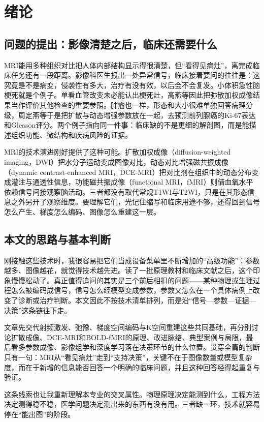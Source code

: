 \section{绪论}

\subsection{问题的提出：影像清楚之后，临床还需要什么}

MRI能用多种组织对比把人体内部结构显示得很清楚，但“看得见病灶”，离完成临床任务还有一段距离。影像科医生报出一处异常信号，临床接着要问的往往是：这究竟是不是病变，侵袭性有多大，治疗有没有效，以后会不会复发。小体积急性脑梗死就是个例子。单看血管改变未必能认出梗死灶，高燕等因此把弥散加权成像结果当作评价其他检查的重要参照\cite{gao2025infarct}。肿瘤也一样，形态和大小很难单独回答病理分级，周定燕等于是把扩散与动态增强参数放在一起，去预测前列腺癌的Ki-67表达和Gleason评分\cite{zhou2024prostate}。两个例子指向同一件事：临床缺的不是更细的解剖图，而是能描述组织功能、微结构和疾病风险的证据。

MRI的技术演进刚好提供了这种可能。扩散加权成像（diffusion-weighted imaging，DWI）把水分子运动变成图像对比，动态对比增强磁共振成像（dynamic contrast-enhanced MRI，DCE-MRI）把对比剂在组织中的动态分布变成灌注与通透性信息，功能磁共振成像（functional MRI，fMRI）则借血氧水平依赖信号间接观察脑活动。三者都没有取代常规T1WI与T2WI，只是在其形态信息之外另开了观察维度。要理解它们，光记住缩写和临床用途不够，还得回到信号怎么产生、梯度怎么编码、图像怎么重建这一层\cite{wu2024mri}。

\subsection{本文的思路与基本判断}

刚接触这些技术时，我很容易把它们当成设备菜单里不断增加的“高级功能”：参数越多、图像越花，就觉得技术越先进。读了一批原理教材和临床文献之后，这个印象慢慢松动了。真正值得追问的其实是三个前后相扣的问题——某种物理或生理过程怎么被编码成信号，信号怎么经模型变成参数，参数又怎么在一个具体病例上改变了诊断或治疗判断。本文因此不按技术清单排列，而是沿“信号—参数—证据—决策”这条链往下走。

文章先交代射频激发、弛豫、梯度空间编码与K空间重建这些共同基础，再分别讨论扩散成像、DCE-MRI和BOLD-fMRI的原理、改进脉络、典型案例与局限，最后看多参数成像、影像组学和深度学习落在决策环节的什么位置。贯穿全篇的判断只有一句：MRI从“看见病灶”走到“支持决策”，关键不在于图像数量或模型复杂度，而在于新增的信息能否回答一个明确的临床问题，并且这种回答经得起重复与验证。

这条线索也让我重新理解本专业的交叉属性。物理原理决定能测到什么，工程方法决定测得稳不稳，医学问题决定测出来的东西有没有用。三者缺一环，技术就容易停在“能出图”的阶段。
